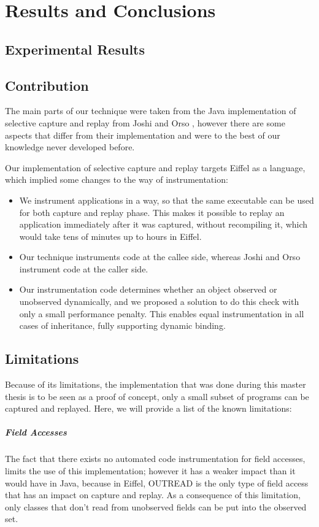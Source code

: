 \chapter{Results and Conclusions}


\section{Experimental Results}

\section{Contribution}
The main parts of our technique were taken from the Java implementation of selective capture and replay from Joshi and Orso \cite{orso05may}, however there are some aspects that differ from their implementation and were to the best of our knowledge never developed before.

Our implementation of selective capture and replay targets Eiffel as a language, which implied some changes to the way of instrumentation:
\begin{itemize}
\item We instrument applications in a way, so that the same executable can be used for both capture and replay phase. This makes it possible to replay an application immediately after it was captured, without recompiling it, which would take tens of minutes up to hours in Eiffel.
\item Our technique instruments code at the callee side, whereas Joshi and Orso instrument code at the caller side. 
\item Our instrumentation code determines whether an object observed or unobserved dynamically, and we proposed a solution to do this check with only a small performance penalty. This enables equal instrumentation in all cases of inheritance, fully supporting dynamic binding. 
\end {itemize}

\section {Limitations}
Because of its limitations, the implementation that was done during this master thesis is to be seen as a proof of concept, only a small subset of programs can be captured and replayed. Here, we will provide a list of the known limitations:

\paragraph{Field Accesses}
The fact that there exists no automated code instrumentation for field accesses, limits the use of this implementation; however it has a weaker impact than it would have in Java, because in Eiffel, OUTREAD is the only type of field access that has an impact on capture and replay. As a consequence of this limitation, only classes that don't read from unobserved fields can be put into the observed set.

